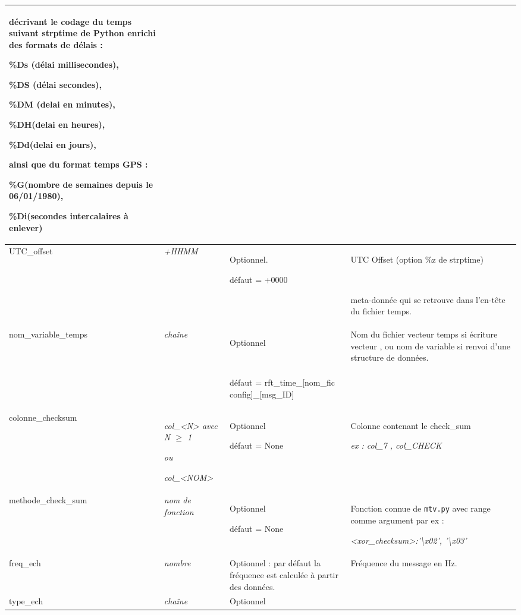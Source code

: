 {\begin{center}
\begin{supertabular}{|p{3.504cm}|p{3.7cm}|p{3.642cm}|p{4.448cm}|}
{\color{black} décrivant le codage du temps suivant strptime de Python enrichi des formats de délais : }

{\color{black} \%Ds (délai millisecondes),}

{\color{black} \%DS (délai secondes),}

{\color{black} \%DM (delai en minutes),}

{\color{black} \%DH(delai en heures),}

{\color{black} \%Dd(delai en jours),}

{\color{black} ainsi que du format temps GPS : }

{\color{black} \%G(nombre de semaines depuis le 06/01/1980),}


{\color{black} \%Di(secondes intercalaires à enlever)}\\\hline
{\color{black} UTC\_offset} &
{\itshape\color{black} +HHMM} &
{\color{black} Optionnel.}

{\color{black} défaut = +0000} &
{\color{black} UTC Offset (option \%z de strptime) }

~

{\color{black} meta-donnée qui se retrouve dans l'en{}-tête du fichier temps.}\\\hline
{\color{black} nom\_variable\_temps} &
{\itshape\color{black} chaîne } &
{\color{black} Optionnel}

~

{\color{black} défaut = rft\_time\_[nom\_fic config]\_[msg\_ID]} &
{\color{black} Nom du fichier vecteur temps si écriture vecteur , ou nom de variable si renvoi d'une structure de
données.}\\\hline
colonne\_checksum  &
{\itshape col\_{\textless}N{\textgreater} avec N ${\geq}$ 1}

{\itshape ou }

{\itshape col\_{\textless}NOM{\textgreater}} &
Optionnel

défaut = None &
Colonne contenant le check\_sum 

{\itshape ex : col\_7 , col\_CHECK}\\\hline
methode\_check\_sum &
{\itshape\color{black} nom de fonction} &
Optionnel

défaut = None &
Fonction connue de \texttt{mtv.py} avec range comme argument par ex :

{\itshape {\textless}xor\_checksum{\textgreater}:'{\textbackslash}x02', '{\textbackslash}x03'}\\\hline
freq\_ech &
{\itshape\color{black} nombre} &
Optionnel : par défaut la fréquence est calculée à partir des données. &
Fréquence du message en Hz.\\\hline
type\_ech &
{\itshape\color{black} chaîne} &
Optionnel~


\end{supertabular}
\end{center}}
